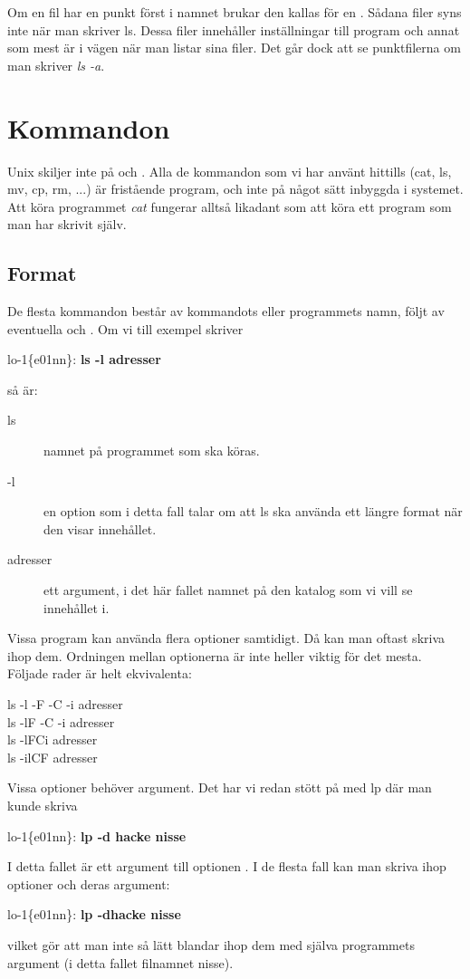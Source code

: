 \documentclass[a4paper,twocolumn]{book}
\begin{document}
Om en fil har en punkt först i namnet brukar den kallas för en
. Sådana filer syns inte när man skriver
ls. Dessa filer innehåller inställningar till program och annat som
mest är i vägen när man listar sina filer. Det går dock att se
punktfilerna om man skriver \emph{ls -a}.
\section{Kommandon}

Unix skiljer inte på  och
. Alla de kommandon som vi har
använt hittills (cat, ls, mv, cp, rm, ...) är fristående program, och
inte på något sätt inbyggda i systemet. Att köra programmet \emph{cat}
fungerar alltså likadant som att köra ett program som man har skrivit
själv. 

\subsection{Format}

De flesta kommandon består av kommandots eller programmets namn, följt
av eventuella  och . Om vi till
exempel skriver
\begin{example}
lo-1\{e01nn\}: \textbf{ls -l adresser}
\end{example}
så är:
\begin{description}
\item[ls] namnet på programmet som ska köras.
\item[-l] en option som i detta fall talar om att ls ska använda ett
  längre format när den visar innehållet.
\item[adresser] ett argument, i det här fallet namnet på den katalog
  som vi vill se innehållet i.
\end{description}

Vissa program kan använda flera optioner samtidigt. Då kan man oftast
skriva ihop dem. Ordningen mellan optionerna är inte heller viktig för
det mesta. Följade rader är helt ekvivalenta:
\begin{ttquote}
  ls -l -F -C -i adresser \\
  ls -lF -C -i adresser \\
  ls -lFCi adresser \\
  ls -ilCF adresser 
\end{ttquote}
Vissa optioner behöver argument. Det har vi redan stött på med lp där
man kunde skriva
\begin{example}
lo-1\{e01nn\}: \textbf{lp -d hacke nisse}
\end{example}
I detta fallet är  ett argument till optionen . I de
flesta fall kan man skriva ihop optioner och deras argument:
\begin{example}
lo-1\{e01nn\}: \textbf{lp -dhacke nisse}
\end{example}
vilket gör att man inte så lätt blandar ihop dem med själva
programmets argument (i detta fallet filnamnet nisse).
\end{document}
